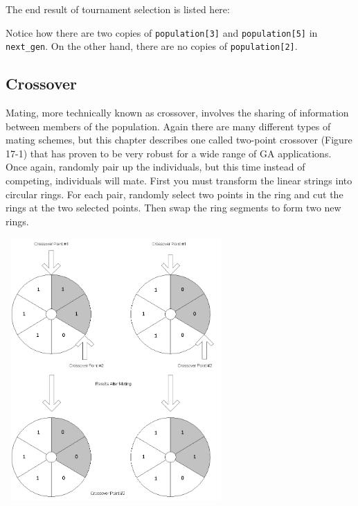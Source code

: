 The end result of tournament selection is listed here:


Notice how there are two copies of \texttt{population[3]} and
\texttt{population[5]} in \texttt{next\_gen}. On the other hand, there
are no copies of \texttt{population[2]}.

\subsection*{Crossover}

Mating, more technically known as crossover, involves the sharing of
information between members of the population. Again there are many
different types of mating schemes, but this chapter describes one
called two-point crossover (Figure 17-1) that has proven to be very
robust for a wide range of GA applications. Once again, randomly pair
up the individuals, but this time instead of competing, individuals
will mate. First you must transform the linear strings into circular
rings. For each pair, randomly select two points in the ring and cut
the rings at the two selected points. Then swap the ring segments to
form two new rings.\\


\begin{center}
\includegraphics[width=3.322in,height=3.9453in]{ub-img/ub-img45.png}
\end{center}

